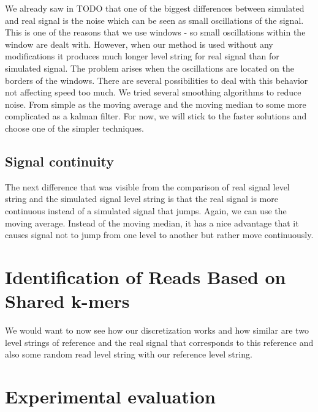 We already saw in TODO that one of the biggest differences between simulated and
real signal is the noise which can be seen as small oscillations of the signal. This is
one of the reasons that we use windows - so small oscillations within the window
are dealt with. However, when our method is used without any modifications it
produces much longer level string for real signal than for simulated signal.
The problem arises when the oscillations are located on the borders of the windows.
There are several possibilities to deal with this behavior not affecting speed too
much. We tried several smoothing algorithms to reduce noise. From simple as the
moving average and the moving median to some more complicated as a kalman filter.
For now, we will stick to the faster solutions and choose one of the simpler techniques.

\subsection{Signal continuity}

The next difference that was visible from the comparison of real signal level string
and the simulated signal level string is that the real signal is more continuous instead
of a simulated signal that jumps. Again, we can use the moving average. Instead of
the moving median, it has a nice advantage that it causes signal not to jump from
one level to another but rather move continuously.


\section{Identification of Reads Based on Shared k-mers}

We would want to now see how our discretization works and how similar are two level
strings of reference and the real signal that corresponds to this reference and also
some random read level string with our reference level string.

\section{Experimental evaluation}
